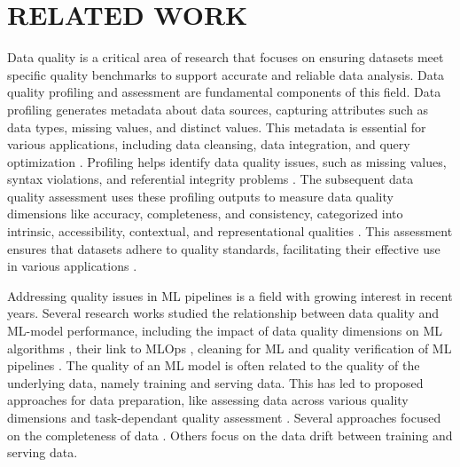 \section{RELATED WORK}
\label{sec:relatedwork}

Data quality is a critical area of research that focuses on ensuring datasets meet specific quality benchmarks to support accurate and reliable data analysis. Data quality profiling and assessment are fundamental components of this field. Data profiling generates metadata about data sources, capturing attributes such as data types, missing values, and distinct values. This metadata is essential for various applications, including data cleansing, data integration, and query optimization \cite{DBLP:journals/sigmod/Naumann13, oliveira2006data, abedjan2017data}. Profiling helps identify data quality issues, such as missing values, syntax violations, and referential integrity problems \cite{chiang2008discovering, ilyas2015trends, razniewski2011completeness}. The subsequent data quality assessment uses these profiling outputs to measure data quality dimensions like accuracy, completeness, and consistency, categorized into intrinsic, accessibility, contextual, and representational qualities \cite{DBLP:journals/jmis/WangS96, sidi2012data}. This assessment ensures that datasets adhere to quality standards, facilitating their effective use in various applications \cite{jayawardene2013curse, jayawardene2015analysis, YEGANEH201424}.


Addressing quality issues in ML pipelines is a field with growing interest in recent years. Several research works studied the relationship between data quality and ML-model performance, including the impact of data quality dimensions on ML algorithms \cite{Budach2022TheEO}, their link to MLOps \cite{renggli2021data,Xin2021ProductionML}, cleaning for ML \cite{DBLP:journals/corr/abs-1904-09483, krishnan2016activeclean} and quality verification of ML pipelines \cite{schelter2018automating}. The quality of an ML model is often related to the quality of the underlying data, namely training and serving data. This has led to proposed approaches for data preparation, like assessing data across various quality dimensions \cite{gupta2021data} and task-dependant quality assessment \cite{Foroni2021EstimatingTE}. Several approaches focused on the completeness of data \cite{karlavs2020nearest, schelter2020learning}. Others focus on the data drift between training and serving data. 


